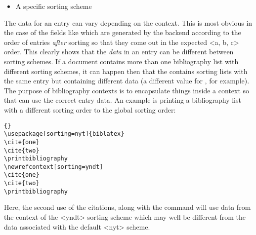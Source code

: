 \begin{itemize}
 \item A specific sorting scheme
\end{itemize}
%
The data for an entry can vary depending on the context. This is most obvious in the case of the  fields like  which are generated by the backend according to the order of entries \emph{after} sorting so that they come out in the expected <a, b, c> order. This clearly shows that the \emph{data} in an entry can be different between sorting schemes. If a document contains more than one bibliography list with different sorting schemes, it can happen then that the  contains sorting lists with the same entry but containing different data (a different value for , for example). The purpose of bibliography contexts is to encapsulate things inside a context so that \biblatex can use the correct entry data. An example is printing a bibliography list with a different sorting order to the global sorting order:

\begin{lstlisting}[style=latex]{}
\usepackage[sorting=nyt]{biblatex}
\cite{one}
\cite{two}
\printbibliography
\newrefcontext[sorting=yndt]
\cite{one}
\cite{two}
\printbibliography
\end{lstlisting}
%
Here, the second use of the citations, along with the  command will use data from the context of the <yndt> sorting scheme which may well be different from the data associated with the default <nyt> scheme.

